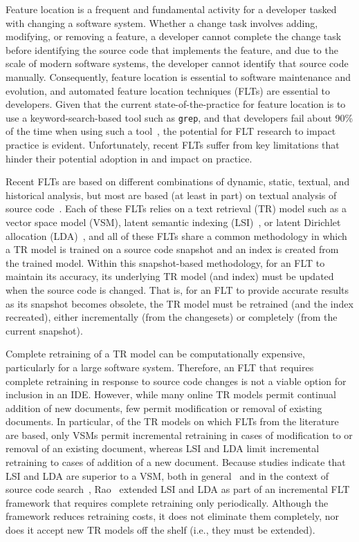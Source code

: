 
Feature location is a frequent and fundamental activity for a developer tasked with changing a software system.
Whether a change task involves adding, modifying, or removing a feature, a developer cannot complete the change task before identifying the source code that implements the feature, and due to the scale of modern software systems, the developer cannot identify that source code manually.
Consequently, feature location is essential to software maintenance and evolution, and automated feature location techniques (FLTs) are essential to developers.
Given that the current state-of-the-practice for feature location is to use a keyword-search-based tool such as \texttt{grep}, and that developers fail about 90\% of the time when using such a tool~\cite{Ko-etal:2006}, the potential for FLT research to impact practice is evident.
Unfortunately, recent FLTs suffer from key limitations that hinder their potential adoption in and impact on practice.

Recent FLTs are based on different combinations of dynamic, static, textual, and historical analysis, but most are based (at least in part) on textual analysis of source code~\cite{Dit-etal:2011}.
Each of these FLTs relies on a text retrieval (TR) model such as a vector space model (VSM), latent semantic indexing (LSI)~\cite{Deerwester-etal:1990}, or latent Dirichlet allocation (LDA)~\cite{Blei-etal:2003}, and all of these FLTs share a common methodology in which a TR model is trained on a source code snapshot and an index is created from the trained model.
Within this snapshot-based methodology, for an FLT to maintain its accuracy, its underlying TR model (and index) must be updated when the source code is changed.
That is, for an FLT to provide accurate results as its snapshot becomes obsolete, the TR model must be retrained (and the index recreated), either incrementally (from the changesets) or completely (from the current snapshot).

Complete retraining of a TR model can be computationally expensive, particularly for a large software system.
Therefore, an FLT that requires complete retraining in response to source code changes is not a viable option for inclusion in an IDE.
However, while many online TR models permit continual addition of new documents, few permit modification or removal of existing documents.
In particular, of the TR models on which FLTs from the literature are based, only VSMs permit incremental retraining in cases of modification to or removal of an existing document,
whereas LSI and LDA limit incremental retraining to cases of addition of a new document.
Because studies indicate that LSI and LDA are superior to a VSM, both in general~\cite{} and in the context of source code search~\cite{},
Rao~\cite{Rao:2013} extended LSI and LDA as part of an incremental FLT framework that requires complete retraining only periodically.
Although the framework reduces retraining costs, it does not eliminate them completely, nor does it accept new TR models off the shelf (i.e., they must be extended).

